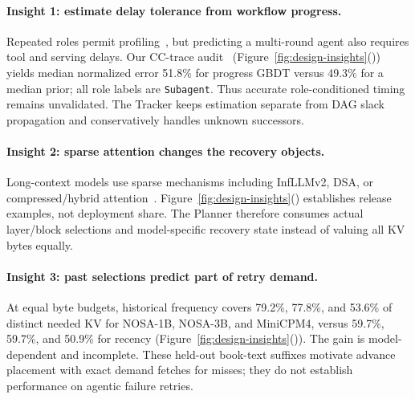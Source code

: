 \paragraph{Insight 1: estimate delay tolerance from workflow progress.}
Repeated roles permit profiling~\cite{yu2026pythia}, but predicting a
multi-round agent also requires tool and serving delays. Our CC-trace
audit~\cite{semianalysis2026cctraces}
(Figure~\ref{fig:design-insights}()) yields median normalized error
51.8\% for progress GBDT versus 49.3\% for a median prior; all role labels
are \texttt{Subagent}. Thus accurate role-conditioned timing remains
unvalidated. The Tracker keeps estimation separate from DAG slack
propagation and conservatively handles unknown successors.

\paragraph{Insight 2: sparse attention changes the recovery objects.}
Long-context models use sparse mechanisms including InfLLMv2,
DSA, or compressed/hybrid attention~\cite{minicpm4model,
openbmb2025minicpm41,deepseek2025v32exp,deepseek2025v32model,
zai2026glm5model,openbmb2026sala,deepseek2026v4model,minimax2026m3,
zai2026glm52,longcat2026sparse}.
Figure~\ref{fig:design-insights}()
establishes release examples, not deployment share.
The Planner therefore consumes actual layer/block selections and
model-specific recovery state instead of valuing all KV bytes equally.

\paragraph{Insight 3: past selections predict part of retry demand.}
At equal byte budgets, historical frequency covers 79.2\%, 77.8\%, and
53.6\% of distinct needed KV for NOSA-1B, NOSA-3B, and MiniCPM4,
versus 59.7\%, 59.7\%, and 50.9\% for recency
(Figure~\ref{fig:design-insights}()). The gain is
model-dependent and incomplete. These held-out book-text suffixes
motivate advance placement with exact demand fetches for misses;
they do not establish performance on agentic failure retries.
